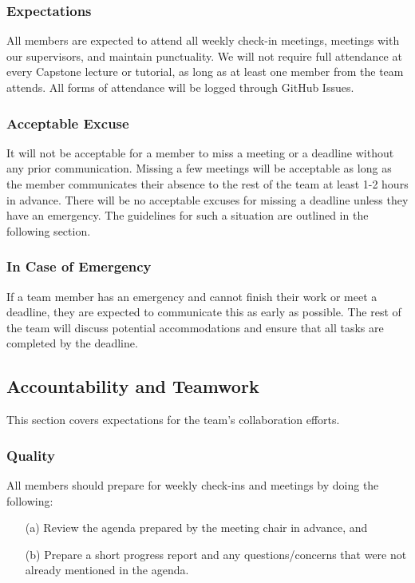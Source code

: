\documentclass{article}
\begin{document}
\subsubsection*{Expectations}

All members are expected to attend all weekly check-in meetings, meetings with our
supervisors, and maintain punctuality. We will not require full attendance at every
Capstone lecture or tutorial, as long as at least one member from the team attends.
All forms of attendance will be logged through GitHub Issues.

\subsubsection*{Acceptable Excuse}

It will not be acceptable for a member to miss a meeting or a deadline without any
prior communication. Missing a few meetings will be acceptable as long as the member
communicates their absence to the rest of the team at least 1-2 hours in advance.
There will be no acceptable excuses for missing a deadline unless they have an 
emergency. The guidelines for such a situation are outlined in the following section.

\subsubsection*{In Case of Emergency}

If a team member has an emergency and cannot finish their work or meet a deadline,
they are expected to communicate this as early as possible. The rest of the team will
discuss potential accommodations and ensure that all tasks are completed by the
deadline.

\subsection*{Accountability and Teamwork}

This section covers expectations for the team's collaboration efforts.

\subsubsection*{Quality} 

All members should prepare for weekly check-ins and meetings by doing the following:

\begin{itemize}
  \item[(a)] Review the agenda prepared by the meeting chair in advance, and
  \item[(b)] Prepare a short progress report and any questions/concerns that were not
  already mentioned in the agenda.
\end{itemize}
\end{document}
